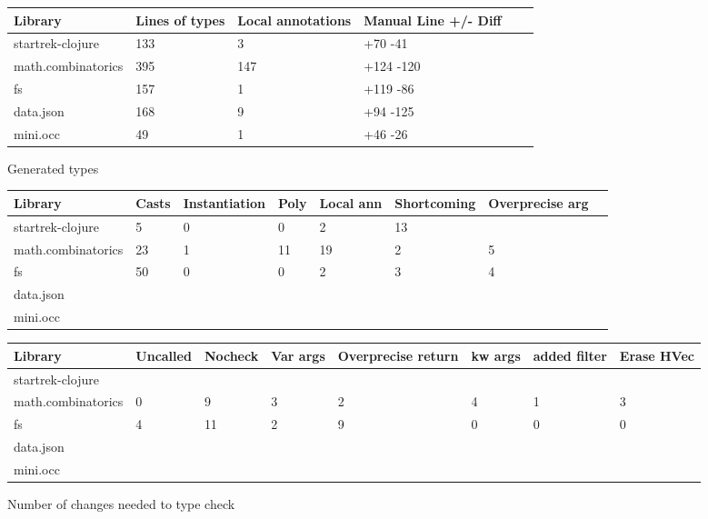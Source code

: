 \begin{figure}
\begin{tabular}{| l | l | l | l | l | l |}
  Library            & Lines of types  & Local annotations & Manual Line +/- Diff \\
  \hline
  startrek-clojure   & 133             & 3                 & +70 -41 \\
  math.combinatorics & 395             & 147               & +124 -120\\
  fs                 & 157             & 1                 & +119 -86\\
  data.json          & 168             & 9                 & +94 -125 \\
  mini.occ           & 49              & 1                 & +46 -26\\
\end{tabular}
\caption{Generated types}
\end{figure}

\begin{figure}
\begin{tabular}{| l | l | l | l | l | l | l | l |}
  Library            & Casts & Instantiation & Poly & Local ann & Shortcoming & Overprecise arg \\
  \hline
  startrek-clojure   & 5     & 0             & 0    & 2         & 13          &               \\
  math.combinatorics & 23    & 1             & 11   & 19        & 2           & 5             \\
  fs                 & 50    & 0             & 0    & 2         & 3           & 4             \\
  data.json          & & & \\
  mini.occ           & & & \\
\end{tabular}
\begin{tabular}{| l | l | l | l | l | l | l | l |}
  Library            & Uncalled & Nocheck & Var args & Overprecise return & kw args & added filter & Erase HVec\\
  \hline
  startrek-clojure   & & & & & &               & \\
  math.combinatorics & 0        & 9       & 3        & 2                  & 4       & 1            & 3\\
  fs                 & 4        & 11      & 2        & 9                  & 0       & 0            & 0\\
  data.json          & & & \\
  mini.occ           & & & \\
\end{tabular}
\caption{Number of changes needed to type check}
\end{figure}




